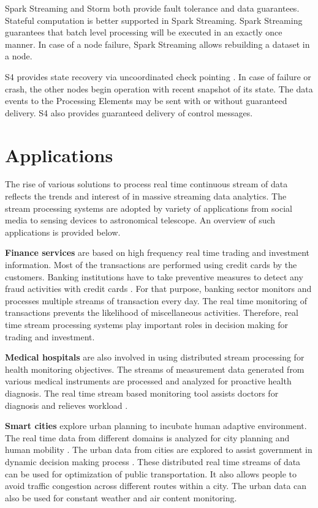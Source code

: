 \documentclass{acm_proc_article-sp}
\begin{document}
Spark Streaming and Storm both provide fault tolerance and data guarantees. Stateful computation is better supported in Spark Streaming. Spark Streaming guarantees that batch level processing will be executed in an exactly once manner. In case of a node failure, Spark Streaming allows rebuilding a dataset in a node.

S4 provides state recovery via uncoordinated check pointing \cite{Chauhan:2012:PEY:2415755.2415892}. In case of failure or crash, the other nodes begin operation with recent snapshot of its state. The data events to the Processing Elements may be sent with or without guaranteed delivery. S4 also provides guaranteed delivery of control messages.  




 
\section{Applications}

The rise of various solutions to process real time continuous stream of data reflects the trends and interest of in massive streaming data analytics. The stream processing systems are adopted by variety of applications from social media to sensing devices to astronomical telescope. An overview of such applications is provided below.

\textbf{Finance services} are based on high frequency real time trading and investment information. Most of the transactions are performed using credit cards by the customers. Banking institutions have  to take preventive measures to detect any fraud activities with credit cards \cite{Storm:FinnServ:CC:Fraud:Detection}.  For that purpose, banking sector monitors and processes multiple streams of transaction every day. The real time monitoring of transactions prevents the  likelihood of miscellaneous activities.  Therefore,  real time stream processing systems play  important roles in decision making for trading and investment.

\textbf{Medical hospitals} are also involved in using distributed stream processing for health monitoring objectives. The streams of measurement data generated from various medical instruments are processed and analyzed for proactive health diagnosis. The real time stream based monitoring tool assists doctors for diagnosis and relieves workload \cite{5431948}. 



\textbf{Smart cities} \cite{hernandez2011smart} explore urban planning to incubate human adaptive environment. The real time data from different domains is analyzed for city planning and human mobility \cite{5512826}. The urban data from cities are explored to assist government in dynamic decision making process \cite{schaffers2011smart}.  These distributed real time streams of data can be used for optimization of public transportation. It also allows people to avoid traffic congestion across different routes within a city. The urban data can also be used for constant weather  and air content monitoring.
\end{document}
